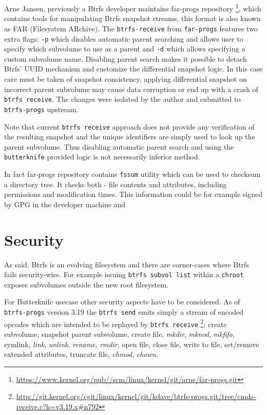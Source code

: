 \documentclass[a4paper,11pt]{kth-mag}
\begin{document}
Arne Jansen, previously a Btrfs developer maintains far-progs repository
\footnote{\url{https://www.kernel.org/pub//scm/linux/kernel/git/arne/far-progs.git}},
which contains tools for manipulating Btrfs snapshot streams,
this format is also known as FAR (Filesystem ARchive).
The \texttt{btrfs-receive} from \texttt{far-progs} features
two extra flags: \texttt{-p} which disables
automatic parent searching and allows user to specify which 
subvolume to use as a parent and \texttt{-d} which 
allows specifying a custom subvolume name.
Disabling parent search makes it possible to detach
Btrfs' UUID mechanism and customize the differential snapshot logic.
In this case care must be taken of snapshot consistency,
applying differential snapshot on incorrect parent subvolume
may cause data corruption or end up with a crash
of \texttt{btrfs receive}.
The changes were isolated by the author and
submitted to \texttt{btrfs-progs} upstream.

Note that current \texttt{btrfs receive} approach does not provide
any verification of the resulting snapshot and the unique
identifiers are simply used to look up the parent subvolume.
Thus disabling automatic parent search and
using the \texttt{butterknife} provided logic 
is not necessarily inferior method.

In fact far-progs repository contains \texttt{fssum}
utility which can be used to checksum a directory tree.
It checks both - file contents and attributes,
including permissions and modification times.
This information could be for example signed by GPG
in the developer machine and 



\section{Security}

As said, Btrfs is an evolving filesystem and there
are corner-cases where Btrfs fails security-wise.
For example issuing \texttt{btrfs subvol list} within
a \texttt{chroot} exposes subvolumes outside the new root filesystem.


For Butterknife usecase other security aspects have to be considered.
As of \texttt{btrfs-progs} version 3.19 the \texttt{btrfs send}
emits simply a stream of encoded opcodes
which are intended to be replayed by \texttt{btrfs receive}
\footnote{\url{http://git.kernel.org/cgit/linux/kernel/git/kdave/btrfs-progs.git/tree/cmds-receive.c?h=v3.19.x\#n792}}:
create subvolume, snapshot parent subvolume,
create file, \emph{mkdir}, \emph{mknod}, \emph{mkfifo}, symlink,
\emph{link}, \emph{unlink}, \emph{rename}, \emph{rmdir}, open file,
close file, write to file, set/remove extended attributes,
truncate file, \emph{chmod}, \emph{chown}.
\end{document}
